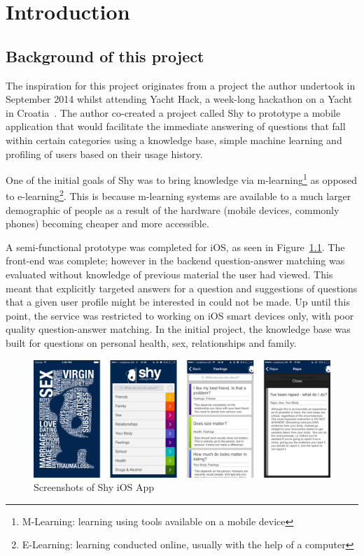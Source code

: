 \documentclass[authoryearcitations]{UoYCSproject}
\begin{document}
\newpage
\chapter{Introduction}


\section{Background of this project}

The inspiration for this project originates from a project the author undertook in September 2014 whilst attending Yacht Hack, a week-long hackathon on a Yacht in Croatia~\cite{yachtHack}.  The author co-created a project called Shy to prototype a mobile application that would facilitate the immediate answering of questions that fall within certain categories using a knowledge base, simple machine learning and profiling of users based on their usage history.

One of the initial goals of Shy was to bring knowledge via m-learning\footnote{M-Learning: learning using tools available on a mobile device} as opposed to e-learning\footnote{E-Learning: learning conducted online, usually with the help of a computer}.  This is because m-learning systems are available to a much larger demographic of people as a result of the hardware (mobile devices, commonly phones) becoming cheaper and more accessible.

A semi-functional prototype was completed for iOS, as seen in Figure~\ref{fig:shy-ios-screenshots}.  The front-end was complete; however in the backend question-answer matching was evaluated without knowledge of previous material the user had viewed.  This meant that explicitly targeted answers for a question and suggestions of questions that a given user profile might be interested in could not be made.  Up until this point, the service was restricted to working on iOS smart devices only, with poor quality question-answer matching.  In the initial project, the knowledge base was built for questions on personal health, sex, relationships and family.

\begin{figure}[htb] 
\includegraphics[width=\linewidth]{shy-screenshots}
\caption{Screenshots of Shy iOS App}
\label{fig:shy-ios-screenshots}
\end{figure}
\end{document}

